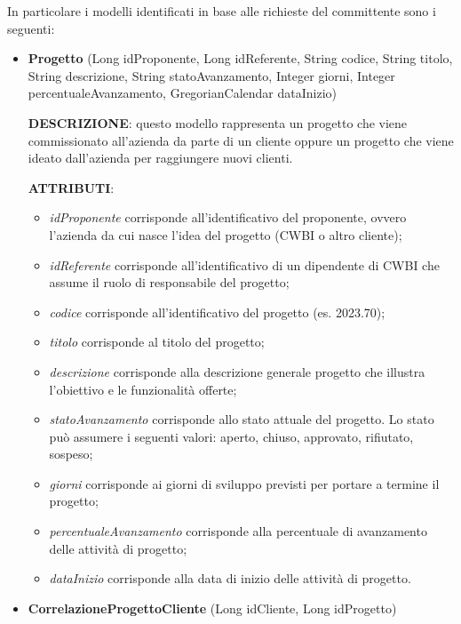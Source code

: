 \noindent In particolare i modelli identificati in base alle richieste del committente sono i seguenti:
\begin{itemize}
\item \textbf{Progetto} (Long idProponente, Long idReferente, String codice, String titolo, String descrizione, String statoAvanzamento, Integer giorni, Integer percentualeAvanzamento, GregorianCalendar dataInizio)

\setlength{\parskip}{3ex}

\noindent \textbf{DESCRIZIONE}: questo modello rappresenta un progetto che viene commissionato all'azienda da parte di un cliente oppure un progetto che viene ideato dall'azienda per raggiungere nuovi clienti.

\setlength{\parskip}{3ex}

\noindent \textbf{ATTRIBUTI}:
\begin{itemize}
\item \textit{idProponente} corrisponde all'identificativo del  proponente, ovvero l'azienda da cui nasce l'idea del progetto (CWBI o altro cliente);
\item \textit{idReferente} corrisponde all'identificativo di un dipendente di CWBI che assume il ruolo di responsabile del progetto;
\item \textit{codice} corrisponde all'identificativo del progetto (es. 2023.70);
\item \textit{titolo} corrisponde al titolo del progetto;
\item \textit{descrizione} corrisponde alla descrizione generale  progetto che illustra l'obiettivo e le funzionalità offerte;
\item \textit{statoAvanzamento} corrisponde allo stato attuale  del progetto. Lo stato può assumere i seguenti valori: {aperto, chiuso, approvato, rifiutato, sospeso};
\item \textit{giorni} corrisponde ai giorni di sviluppo previsti per portare a termine il progetto;
\item \textit{percentualeAvanzamento} corrisponde alla percentuale di avanzamento delle attività di progetto;
\item \textit{dataInizio} corrisponde alla data di inizio delle attività di progetto.
\end{itemize}

\setlength{\parskip}{6ex}

\item \textbf{CorrelazioneProgettoCliente} (Long idCliente, Long idProgetto)


\end{itemize}
